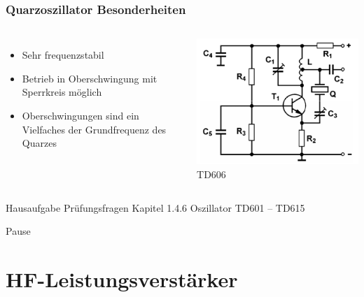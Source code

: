 \begin{frame}
    \frametitle{Quarzoszillator Besonderheiten}
    \begin{columns}
         \begin{itemize}
			\item Sehr frequenzstabil
			\item Betrieb in Oberschwingung mit Sperrkreis möglich
			\item Oberschwingungen sind ein Vielfaches der Grundfrequenz des Quarzes
    	\end{itemize}    
            \includegraphics[width=\textwidth,height=.8\textheight,keepaspectratio]{a07/TD606_quarz_Oberschwingung.png}\\
	    {\tiny TD606 \hyperlink{refs}{\cite{bna}}}
    \end{columns}
\end{frame}

\begin{frame}
  \begin{exampleblock}{Hausaufgabe}
    Prüfungsfragen Kapitel 1.4.6 Oszillator TD601 -- TD615
  \end{exampleblock}
\end{frame}

\begin{frame}
  \begin{center}
    \Huge Pause
  \end{center}
\end{frame}

\section*{HF-Leistungs\-verstärker}

